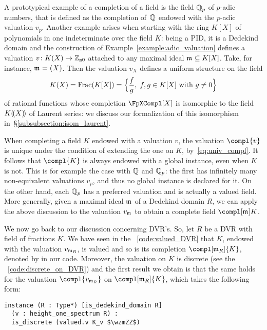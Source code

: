 \documentclass[sigplan,10pt,anonymous,review]{acmart}
\begin{document}
A prototypical example of a completion of a field is the field $\QQ_p$ of $p$-adic numbers, that is defined as the completion of~$\QQ$ endowed with the $p$-adic valuation $v_p$. Another example arises when starting with the ring $K[X]$ of polynomials in one indeterminate over the field $K$: being a PID, it is a Dedekind domain and the construction of Example~\ref{example:adic_valuation} defines a valuation $v\colon K(X)\to\wzmZZ$ attached to any maximal ideal $\maxid[\empty]\subseteq K[X]$. Take, for instance, $\maxid[\empty]=(X)$. Then the valuation $v_X$ defines a uniform structure on the field
\[
K(X)=\Frac(K[X])=\Bigl\{\frac{f}{g},\; f,g\in K[X]\text{ with }g\ne 0\Bigr\}
\]
of rational functions whose completion $\FpXCompl[X]$ is isomorphic to the field $\laurentseries[K]$ of Laurent series: we discuss our formalization of this isomorphism in~\S\ref{subsubsection:isom_laurent}.

When completing a field $K$ endowed with a valuation $v$, the valuation $\compl{v}$ is unique under the condition of extending the one on $K$, by~\eqref{eq:univ_compl}. It follows that $\compl{K}$ is always endowed with a global  instance, even when $K$ is not. This is for example the case with $\QQ$ and $\QQ_p$: the first has infinitely many non-equivalent valuations $v_p$, and thus no global  instance is declared for it. On the other hand, each $\QQ_p$ has a preferred valuation and is actually a valued field. More generally, given a maximal ideal $\maxid[\empty]$ of a Dedekind domain $R$, we can apply the above discussion to the valuation $v_{\maxid[\empty]}$ to obtain a complete  field $\compl[{\maxid[\empty]}]{K}$\href{https://leanprover-community.github.io/mathlib_docs/ring_theory/dedekind_domain/adic_valuation.html#is_dedekind_domain.height_one_spectrum.valued_adic_completion}{\extlink}.

We now go back to our discussion concerning DVR's. So, let $R$ be a DVR with field of fractions $K$. We have seen in the \LClistingname~\ref{code:valued_DVR} that $K$, endowed with the valuation $v_{\maxid}$, is valued and so is its completion $\compl[\maxid]{K}$, denoted by  in our code. Moreover, the valuation on $K$ is discrete (see the \LClistingname~\ref{code:discrete_on_DVR}) and the first result we obtain is that the same holds for the valuation $\compl{v_{\maxid}}$ on $\compl[\maxid]{K}$, which takes the following form\href{https://github.com/LCFT-Lean/local_fields/blob/76ad487d09babdb0018f394a5634526637ee014a/src/discrete_valuation_ring/complete.lean#L58}{\extlink}:
\begin{lstlisting}
instance (R : Type*) [is_dedekind_domain R]
  (v : height_one_spectrum R) : 
  is_discrete (valued.v K_v $\wzmZZ$)
\end{lstlisting}
\end{document}

